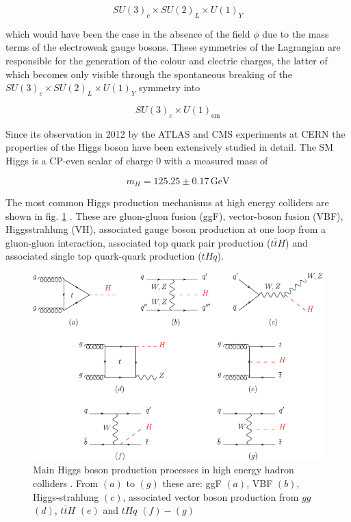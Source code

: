 \begin{equation*}
	SU(3)_c \times SU(2)_L \times U(1)_Y
\end{equation*}

which would have been the case in the absence of the field $\phi$ due to the mass terms of the electroweak gauge bosons. These symmetries of the Lagrangian are responsible for the generation of the colour and electric charges, the latter of which becomes only visible through the spontaneous breaking of the $SU(3)_c \times SU(2)_L \times U(1)_Y$ symmetry into

\begin{equation*}
	SU(3)_c \times U(1)_\text{em}
\end{equation*}

Since its observation in 2012 by the ATLAS and CMS experiments at CERN \cite{Chatrchyan_2012} the properties of the Higgs boson have been extensively studied in detail. The SM Higgs is a CP-even scalar of charge 0 with a measured mass of

\begin{equation*}
	m_H = 125.25 \pm 0.17 \, \text{GeV}
\end{equation*}

The most common Higgs production mechanisms at high energy colliders are shown in fig. \ref{fig:higgsproduction} \cite{Workman:2022ynf}. These are gluon-gluon fusion (ggF), vector-boson fusion (VBF), Higgsstrahlung (VH), associated gauge boson production at one loop from a gluon-gluon interaction, associated top quark pair production ($t\bar{t}H$) and associated single top quark-quark production ($tHq$).

\begin{figure}[h!]
	\centering
	\includegraphics[width=0.8\linewidth]{figures/theory/higgsproduction.pdf}
	\caption{Main Higgs boson production processes in high energy hadron colliders \cite{Workman:2022ynf}. From $(a)$ to $(g)$ these are: ggF $(a)$, VBF $(b)$, Higgs-strahlung $(c)$, associated vector boson production from $gg$ $(d)$, $t\bar{t}H$ $(e)$ and $tHq$ $(f)-(g)$}
	\label{fig:higgsproduction}
\end{figure}

